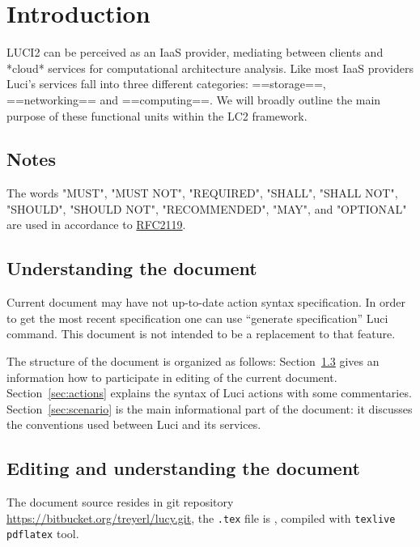 \section{Introduction}
LUCI2 can be perceived as an IaaS provider, mediating between clients and *cloud* services for computational architecture analysis. Like most IaaS providers Luci's services fall into three different categories: ==storage==, ==networking== and ==computing==. We will broadly outline the main purpose of these functional units within the LC2 framework.

\subsection{Notes}
The words "MUST", "MUST NOT", "REQUIRED", "SHALL", "SHALL NOT", "SHOULD", "SHOULD NOT", "RECOMMENDED", "MAY", and "OPTIONAL" are used in accordance to \href{https://www.ietf.org/rfc/rfc2119.txt}{RFC2119}.

\subsection{Understanding the document}
Current document may have not up-to-date action syntax specification.
In order to get the most recent specification one can use ``generate specification'' \ac{Luci} command.
This document is not intended to be a replacement to that feature.

The structure of the document is organized as follows:
Section~\ref{sec:editing} gives an information how to participate in editing of the current document.
Section~\ref{sec:actions} explains the syntax of \ac{Luci} actions with some commentaries.
Section~\ref{sec:scenario} is the main informational part of the document: it discusses the conventions used between \ac{Luci} and its services.

\subsection{Editing and understanding the document}
\label{sec:editing}

The document source resides in git repository \url{https://bitbucket.org/treyerl/lucy.git},
the \texttt{.tex} file is , compiled with \texttt{texlive} \texttt{pdflatex} tool.

